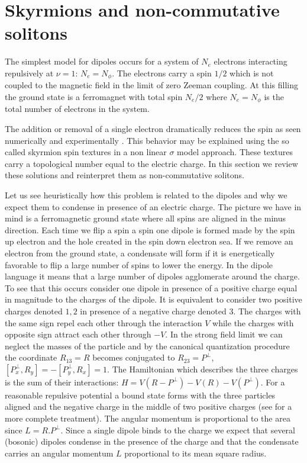 \documentclass[a4paper,11pt]{article}
\begin{document}
\section{Skyrmions and non-commutative solitons} 

The simplest model for dipoles occurs  for a system of $N_e$
electrons interacting repulsively
at $\nu=1$: $N_e=N_{\phi}$. The electrons carry a spin $1/2$
which is not coupled to the magnetic field in the limit of zero
Zeeman coupling. At this filling the ground state is a ferromagnet
with total spin $N_e/2$ where $N_e=N_{\phi}$ is the total number of electrons
in the system. 

The addition or removal of a single
electron dramatically reduces the spin as seen numerically \cite{REZ}
and experimentally \cite{TYC}.
This behavior may be explained using the so called skyrmion spin textures
\cite{SON,MAC} in
a non linear $\sigma$ model approach.
These textures carry a topological number equal to the electric charge.
In this section 
we review these solutions and reinterpret them as
non-commutative solitons.

Let us see heuristically how this problem is related to the dipoles and
why we expect them to
condense in presence of an electric charge.
The picture we have in mind is a ferromagnetic ground state where all spins
are aligned in the minus direction. Each time we flip a spin a spin one
dipole is formed made by the spin up electron and the hole created in the 
spin down electron sea.
If we remove an electron from the  ground state, a condensate will
form if it is energetically favorable to flip a large number of spins to
lower the energy. In the dipole language it means that a large number of dipoles 
agglomerate around the charge. To see that this occurs
consider one dipole in presence of a positive charge equal in magnitude to the
charges of the dipole. It is equivalent to consider
two positive charges denoted $1,2$ in presence of a negative 
charge denoted $3$. The charges with the same sign repel each other through the
interaction $V$ while the charges with opposite sign attract each other through $-V$. 
In the strong field limit we can neglect the masses of the particle
and by the canonical quantization procedure the coordinate $R_{13}=R$
becomes conjugated to $R_{23}=P^{\perp}$, $[P^{\perp}_x,R_y]=-[P^{\perp}_y,R_x]=1$.
The Hamiltonian which describes the three charges is the sum of their interactions:
$H=V(R-P^{\perp})-V(R)-V(P^{\perp})$. For a reasonable repulsive potential a
bound state forms with the three particles aligned and the negative charge
in the middle of two positive charges (see \cite{DZY} for a more complete treatment). 
The angular momentum is proportional
to the area since $L=R.P^{\perp}$.
Since a single dipole binds to the charge
we expect that 
several (bosonic) dipoles condense in the presence of the charge
and that the condensate carries an angular momentum $L$ proportional to its mean square
radius.
\end{document}
